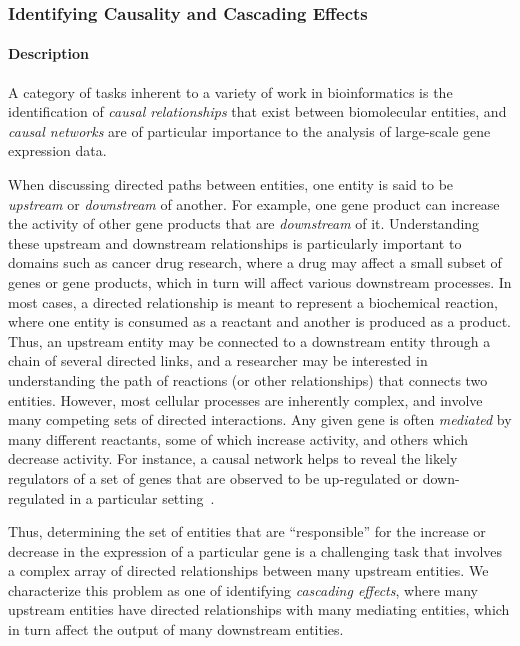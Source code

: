 \documentclass[twocolumn]{bmcart}%
\begin{document}
\subsubsection*{Identifying Causality and Cascading Effects}

\paragraph*{Description}

A category of tasks inherent to a variety of work in bioinformatics is the identification of \textit{causal relationships} that exist between biomolecular entities, and \emph{causal networks} are of particular importance to the analysis of large-scale gene expression data.

When discussing directed paths between entities, one entity is said to be \emph{upstream} or \emph{downstream} of another.
For example, one gene product can increase the activity of other gene products that are \emph{downstream} of it.
Understanding these upstream and downstream relationships is particularly important to domains such as cancer drug research, where a drug may affect a small subset of genes or gene products, which in turn will affect various downstream processes.
In most cases, a directed relationship is meant to represent a biochemical reaction, where one entity is consumed as a reactant and another is produced as a product.
Thus, an upstream entity may be connected to a downstream entity through a chain of several directed links, and a researcher may be interested in understanding the path of reactions (or other relationships) that connects two entities.
However, most cellular processes are inherently complex, and involve many competing sets of directed interactions.
Any given gene is often \textit{mediated} by many different reactants, some of which increase activity, and others which decrease activity.
For instance, a causal network helps to reveal the likely regulators of a set of genes that are observed to be up-regulated or down-regulated in a particular setting~\cite{felciano2013predictive, Kramer2013ipa-causal}.

Thus, determining the set of entities that are ``responsible'' for the increase or decrease in the expression of a particular gene is a challenging task that involves a complex array of directed relationships between many upstream entities.
We characterize this problem as one of identifying \textit{cascading effects}, where many upstream entities have directed relationships with many mediating entities, which in turn affect the output of many downstream entities.
\end{document}
